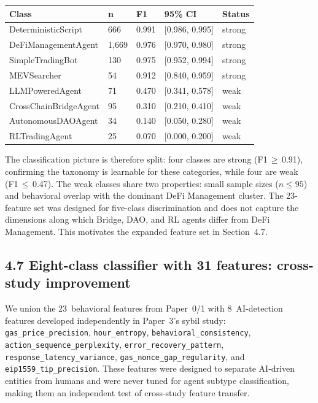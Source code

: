 \documentclass[sigconf,nonacm=false]{acmart}
\begin{document}
\begin{table}[h]
\centering
\small
\begin{tabular}{lllll}
\toprule
Class & n & F1 & 95\% CI & Status \\
\midrule
DeterministicScript & 666 & 0.991 & [0.986, 0.995] & strong \\
DeFiManagementAgent & 1,669 & 0.976 & [0.970, 0.980] & strong \\
SimpleTradingBot & 130 & 0.975 & [0.952, 0.994] & strong \\
MEVSearcher & 54 & 0.912 & [0.840, 0.959] & strong \\
LLMPoweredAgent & 71 & 0.470 & [0.341, 0.578] & weak \\
CrossChainBridgeAgent & 95 & 0.310 & [0.210, 0.410] & weak \\
AutonomousDAOAgent & 34 & 0.140 & [0.050, 0.280] & weak \\
RLTradingAgent & 25 & 0.070 & [0.000, 0.200] & weak \\
\bottomrule
\end{tabular}
\end{table}

The classification picture is therefore split: four classes are strong (F1\,$\geq$\,0.91), confirming the taxonomy is learnable for these categories, while four are weak (F1\,$\leq$\,0.47). The weak classes share two properties: small sample sizes ($n \leq 95$) and behavioral overlap with the dominant DeFi Management cluster. The 23-feature set was designed for five-class discrimination and does not capture the dimensions along which Bridge, DAO, and RL agents differ from DeFi Management. This motivates the expanded feature set in Section~4.7.


\subsection{4.7 Eight-class classifier with 31 features: cross-study improvement}

We union the 23~behavioral features from Paper~0/1 with 8~AI-detection features developed independently in Paper~3's sybil study: \texttt{gas\_price\_precision}, \texttt{hour\_entropy}, \texttt{behavioral\_consistency}, \texttt{action\_sequence\_perplexity}, \texttt{error\_recovery\_pattern}, \texttt{response\_latency\_variance}, \texttt{gas\_nonce\_gap\_regularity}, and \texttt{eip1559\_tip\_precision}. These features were designed to separate AI-driven entities from humans and were never tuned for agent subtype classification, making them an independent test of cross-study feature transfer.
\end{document}
